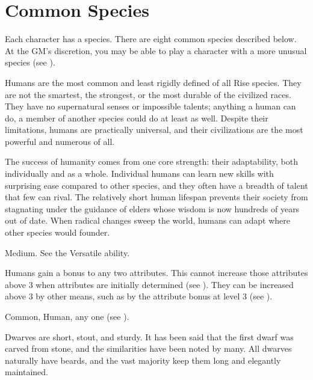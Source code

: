 \chapter{Common Species}\label{Common Species}
Each character has a species.
There are eight common species described below.
At the GM's discretion, you may be able to play a character with a more unusual species (see ).


  Humans are the most common and least rigidly defined of all Rise species.
  They are not the smartest, the strongest, or the most durable of the civilized races.
  They have no supernatural senses or impossible talents; anything a human can do, a member of another species could do at least as well.
  Despite their limitations, humans are practically universal, and their civilizations are the most powerful and numerous of all.

  The success of humanity comes from one core strength: their adaptability, both individually and as a whole.
  Individual humans can learn new skills with surprising ease compared to other species, and they often have a breadth of talent that few can rival.
  The relatively short human lifespan prevents their society from stagnating under the guidance of elders whose wisdom is now hundreds of years out of date.
  When radical changes sweep the world, humans can adapt where other species would founder.

   Medium.
   See the Versatile ability.
  \begin{raggeditemize}
     Humans gain a  bonus to any two attributes.
      This cannot increase those attributes above 3 when attributes are initially determined (see ).
      They can be increased above 3 by other means, such as by the attribute bonus at level 3 (see ).
  \end{raggeditemize}
   Common, Human, any one  (see ).


  Dwarves are short, stout, and sturdy.
  It has been said that the first dwarf was carved from stone, and the similarities have been noted by many.
  All dwarves naturally have beards, and the vast majority keep them long and elegantly maintained.

